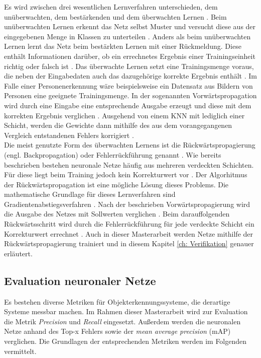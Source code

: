 		Es wird zwischen drei wesentlichen Lernverfahren unterschieden, dem unüberwachten, dem bestärkenden und dem überwachten Lernen \cite{Kriesel}. Beim unüberwachten Lernen erkennt das Netz selbst Muster und versucht diese aus der eingegebenen Menge in Klassen zu unterteilen \cite{Kriesel}. Anders als beim unüberwachten Lernen lernt das Netz beim bestärkten Lernen mit einer Rückmeldung. Diese enthält Informationen darüber, ob ein errechnetes Ergebnis einer Trainingseinheit richtig oder falsch ist \cite{Kriesel}. Das überwachte Lernen setzt eine Trainingsmenge voraus, die neben der Eingabedaten auch das dazugehörige korrekte Ergebnis enthält \cite{Kriesel,bildv2020}. Im Falle einer Personenerkennung wäre beispielsweise ein Datensatz aus Bildern von Personen eine geeignete Trainingsmenge. In der sogenannten Vorwärtspropagation wird durch eine Eingabe eine entsprechende Ausgabe erzeugt und diese mit dem korrekten Ergebnis verglichen \cite{bildv2020}. Ausgehend von einem KNN mit lediglich einer Schicht, werden die Gewichte dann mithilfe des aus dem vorangegangenen Vergleich entstandenen Fehlers korrigiert \cite{bildv2020}.\\
		
		Die meist genutzte Form des überwachten Lernens ist die Rückwärtspropagierung (engl. Backpropagation) oder Fehlerrückführung genannt \cite{Ertel}. Wie bereits beschrieben bestehen neuronale Netze häufig aus mehreren verdeckten Schichten. Für diese liegt beim Training jedoch kein Korrekturwert vor \cite{bildv2020}. Der Algorhitmus der Rückwärtspropagation ist eine mögliche Lösung dieses Problems. Die mathematische Grundlage für dieses Lernverfahren sind Gradientenabstiegsverfahren \cite{Kriesel,bildv2020}. Nach der beschrieben Vorwärtspropagierung wird die Ausgabe des Netzes mit Sollwerten verglichen \cite{bildv2020}. Beim darauffolgenden Rückwärtsschritt wird durch die Fehlerrückführung für jede verdeckte Schicht ein Korrekturwert errechnet \cite{bildv2020}. Auch in dieser Masterarbeit werden Netze mithilfe der Rückwärtspropagierung trainiert und in diesem Kapitel \ref{ch: Verifikation} genauer erläutert.\\
		
	
		
		\subsection{Evaluation neuronaler Netze}
		\label{subsec: evaluation neuronaler netze}
		Es bestehen diverse Metriken für Objekterkennungssysteme, die derartige Systeme messbar machen. Im Rahmen dieser Masterarbeit wird zur Evaluation die Metrik \textit{Precision} und \textit{Recall} eingesetzt. Außerdem werden die neuronalen Netze anhand des Top-x Fehlers sowie der \textit{mean average precision} (mAP) verglichen. Die Grundlagen der entsprechenden Metriken werden im Folgenden vermittelt.\\
		
